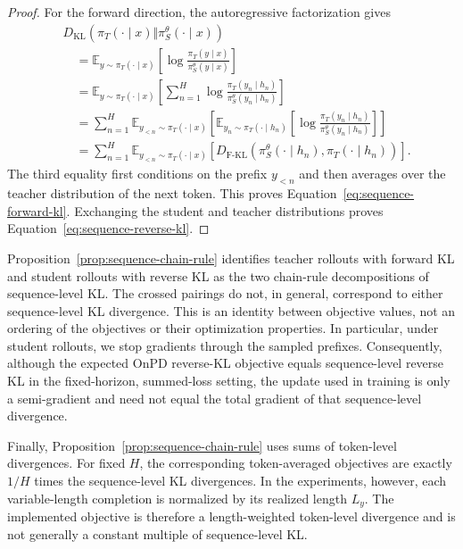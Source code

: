 \documentclass{article} %
\theoremstyle{plain}
\theoremstyle{definition}
\theoremstyle{remark}
\begin{document}
\begin{proof}
For the forward direction, the autoregressive factorization gives
\begin{align}
    &D_{\mathrm{KL}}\!\left(
        \pi_T(\cdot\mid x)\Vert\pi_S^\theta(\cdot\mid x)
    \right)\nonumber\\
    &\quad=
    \mathbb E_{y\sim\pi_T(\cdot\mid x)}
    \left[
        \log
        \frac{\pi_T(y\mid x)}{\pi_S^\theta(y\mid x)}
    \right]\\
    &\quad=
    \mathbb E_{y\sim\pi_T(\cdot\mid x)}
    \left[
        \sum_{n=1}^H
        \log
        \frac{\pi_T(y_n\mid h_n)}
             {\pi_S^\theta(y_n\mid h_n)}
    \right]\\
    &\quad=
    \sum_{n=1}^H
    \mathbb E_{y_{<n}\sim\pi_T(\cdot\mid x)}
    \left[
        \mathbb E_{y_n\sim\pi_T(\cdot\mid h_n)}
        \left[
            \log
            \frac{\pi_T(y_n\mid h_n)}
                 {\pi_S^\theta(y_n\mid h_n)}
        \right]
    \right]\\
    &\quad=
    \sum_{n=1}^H
    \mathbb E_{y_{<n}\sim\pi_T(\cdot\mid x)}
    \left[
        D_{\mathrm{F\text{-}KL}}\left(
            \pi_S^\theta(\cdot\mid h_n),
            \pi_T(\cdot\mid h_n)
        \right)
    \right].
\end{align}
The third equality first conditions on the prefix $y_{<n}$ and then averages
over the teacher distribution of the next token.  This proves
Equation~\ref{eq:sequence-forward-kl}.  Exchanging the student and teacher
distributions proves Equation~\ref{eq:sequence-reverse-kl}.
\end{proof}

Proposition~\ref{prop:sequence-chain-rule} identifies teacher rollouts with
forward KL and student rollouts with reverse KL as the two chain-rule
decompositions of sequence-level KL.  The crossed pairings do not, in general,
correspond to either sequence-level KL divergence.  This is an identity between
objective values, not an ordering of the objectives or their optimization
properties.  In particular, under student rollouts, we stop gradients through
the sampled prefixes.  Consequently, although the expected OnPD reverse-KL
objective equals sequence-level reverse KL in the fixed-horizon, summed-loss
setting, the update used in training is only a semi-gradient and need not equal
the total gradient of that sequence-level divergence.

Finally, Proposition~\ref{prop:sequence-chain-rule} uses sums of token-level
divergences.  For fixed $H$, the corresponding token-averaged objectives are
exactly $1/H$ times the sequence-level KL divergences.  In the experiments,
however, each variable-length completion is normalized by its realized length
$L_y$.  The implemented objective is therefore a length-weighted token-level
divergence and is not generally a constant multiple of sequence-level KL.
\end{document}

